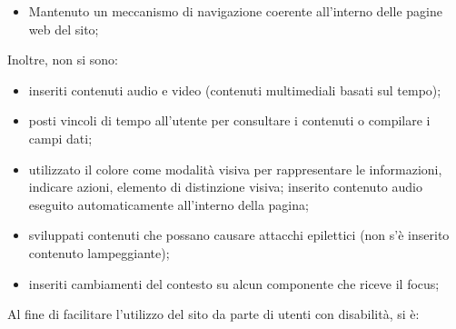 {{\begin{itemize}
\begin{itemize}
			\item alternative testuali per il contenuto non testuale:
				\begin{itemize} \itemsep0.5pt
					\item corredata ogni immagine con gli attributi alt e title che la descrivono;
					\item aggiunta di una label ad ogni campo di input della form, in aiuto dello screen reader;
				\end{itemize}
			\item intestazioni ed etichette appropriate; 
			\item l'indicatore del focus nelle interfacce utilizzabili da tastiera; 
			\item sezioni per organizzare il testo.
			\item la lingua predefinita per il contenuto delle pagine; forniti i significati delle abbreviazioni e degli acronimi utilizzati; usati gli attributi \texttt{xml:lang} per definire parole o blocchi in lingua diversa da quella predefinita della pagina;
 			\item Definiti i meta tag: \textit{Description, Keywords, Copyright, Author}; le parole chiave contenute nel tag "keywords" sono in lingua italiana, visto il pubblico a cui il sito si rivolge.
 			\item È stato definito infine un link di ritorno ad inizio pagina.
		\end{itemize} 
		\item Mantenuto un meccanismo di navigazione coerente all'interno delle pagine web del sito;
	\end{itemize}
	Inoltre, non si sono:
	\begin{itemize}\itemsep1pt
		\item inseriti contenuti audio e video (contenuti multimediali basati sul tempo);
		\item posti vincoli di tempo all'utente per consultare i contenuti o compilare i campi dati;
		\item utilizzato il colore come modalità visiva per rappresentare le informazioni, indicare azioni, elemento di distinzione visiva; inserito contenuto audio eseguito automaticamente all'interno della pagina;
		\item sviluppati contenuti che possano causare attacchi epilettici (non s'è inserito contenuto lampeggiante);
		\item inseriti cambiamenti del contesto su alcun componente che riceve il focus;
	\end{itemize}
		Al fine di facilitare l'utilizzo del sito da parte di utenti con disabilità, si è:
		\begin{itemize}\itemsep1pt


\end{itemize}}}
